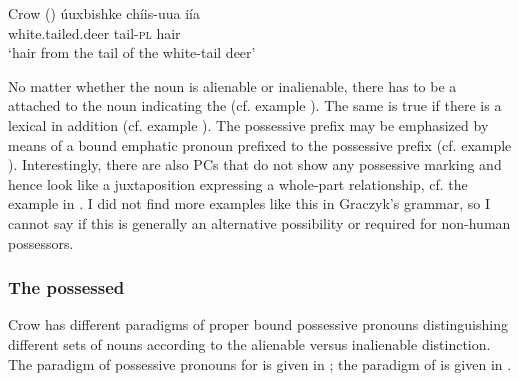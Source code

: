 \documentclass[output=paper]{LSP/langsci}
\begin{document}
\ea {}Crow (\citealt[236]{Graczyk2007}) \label{crowdeer}
\ex 
\gll úuxbishke            chíis-uua iía \\
white.tailed.deer tail-\textsc{pl}      hair \\
\glt `hair from the tail of the white-tail deer'
\z \z

No matter whether the  noun is alienable or inalienable, there has to be a  attached to the  noun indicating the  (cf. example ). The same is true if there is a lexical  in addition (cf. example ). The possessive prefix may be emphasized by means of a bound emphatic pronoun prefixed to the possessive prefix (cf. example ). Interestingly, there are also PCs that do not show any possessive marking and hence look like a juxtaposition expressing a whole-part relationship, cf. the example in . I did not find more examples like this in Graczyk's grammar, so I cannot say if this is generally an alternative possibility or required for non-human possessors.

\subsubsection{The possessed}
Crow has different paradigms of proper bound possessive pronouns distinguishing different sets of  nouns according to the alienable versus inalienable distinction. The paradigm of possessive pronouns for  is given in ; the paradigm of  is given in .
\end{document}
